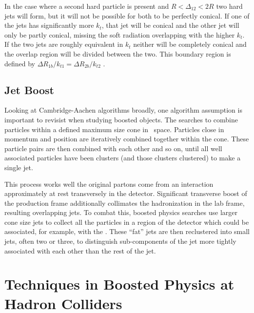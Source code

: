 In the case where a second hard particle is present and $R < \Delta_{12} < 2R$ two hard jets will form, but it will not be possible for both to be perfectly conical. If one of the jets has significantly more $k_t$, that jet will be conical and the other jet will only be partly conical, missing the soft radiation overlapping with the higher $k_t$. If the two jets are roughly equivalent in $k_t$ neither will be completely conical and the overlap region will be divided between the two. This boundary region is defined by $\Delta R_{1b}/k_{t1} = \Delta R_{2b}/k_{t2}$ \cite{AK_jets}.


\subsection{Jet Boost}

Looking at Cambridge-Aachen algorithms broadly, one algorithm assumption is important to revisist when studying boosted objects. The \antikt searches to combine particles within a defined maximum size cone in \etaphi~space. Particles close in momentum and position are iteratively combined together within the cone. These particle pairs are then combined with each other and so on, until all well associated particles have been clusters (and those clusters clustered) to make a single jet.

This process works well the original partons come from an interaction approximately at rest transversely in the detector. Significant transverse boost of the production frame additionally collimates the hadronization in the lab frame, resulting overlapping jets. To combat this, boosted physics searches use larger cone size jets to collect all the particles in a region of the detector which could be associated, for example, with the \higgstobb. These ``fat'' jets are then reclustered into small jets, often two or three, to distinguish sub-components of the jet more tightly associated with each other than the rest of the jet. 

\section{Techniques in Boosted Physics at Hadron Colliders}

